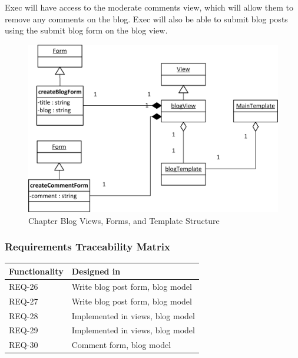 \documentclass{article}
\begin{document}
Exec will have access to the moderate comments view, which will allow them to remove any comments on the blog. Exec will also be able to submit blog posts using the submit blog form on the blog view.

\FloatBarrier
\begin{figure}[h!]
\centering
\includegraphics[scale=.65]{img/viewFormTemplateDiagrams/blog}
\caption{Chapter Blog Views, Forms, and Template Structure}
\label{fig:chapterBlogViewFormTemplateDiagram}
\end{figure}
\FloatBarrier

\subsubsection{Requirements Traceability Matrix}

\FloatBarrier
\begin{table}
    \begin{tabular}{|l|l|}
        \hline
        Functionality & Designed in                      \\ \hline
        REQ-26        & Write blog post form, blog model \\ 
        REQ-27        & Write blog post form, blog model \\ 
        REQ-28        & Implemented in views, blog model \\ 
        REQ-29        & Implemented in views, blog model \\ 
        REQ-30        & Comment form, blog model         \\
        \hline
    \end{tabular}
\end{table}
\FloatBarrier
\end{document}
